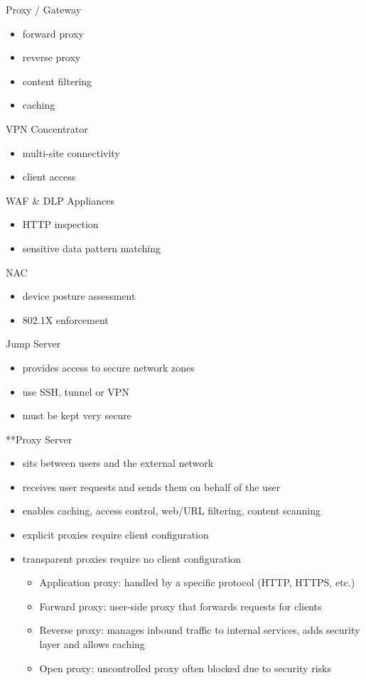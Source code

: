 \documentclass[11pt]{article}
\begin{document}
Proxy / Gateway
\begin{itemize}
\item forward proxy
\item reverse proxy
\item content filtering
\item caching
\end{itemize}

VPN Concentrator
\begin{itemize}
\item multi-site connectivity
\item client access
\end{itemize}

WAF \& DLP Appliances
\begin{itemize}
\item HTTP inspection
\item sensitive data pattern matching
\end{itemize}

NAC
\begin{itemize}
\item device posture assessment
\item 802.1X enforcement
\end{itemize}

Jump Server
\begin{itemize}
\item provides access to secure network zones
\item use SSH, tunnel or VPN
\item must be kept very secure
\end{itemize}

**Proxy Server
\begin{itemize}
\item sits between users and the external network
\item receives user requests and sends them on behalf of the user
\item enables caching, access control, web/URL filtering, content scanning
\item explicit proxies require client configuration
\item transparent proxies require no client configuration

\begin{itemize}
\item Application proxy: handled by a specific protocol (HTTP, HTTPS, etc.)
\item Forward proxy: user-side proxy that forwards requests for clients
\item Reverse proxy: manages inbound traffic to internal services, adds security layer and allows caching
\item Open proxy: uncontrolled proxy often blocked due to security risks
\end{itemize}
\end{itemize}
\end{document}
